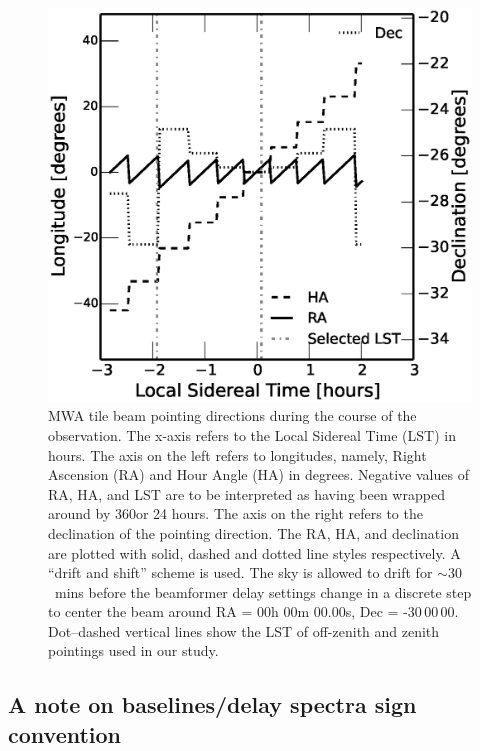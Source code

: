 \documentclass[preprint2,iop,numberedappendix]{emulateapj}
\begin{document}
\begin{figure}[htb]
\centering
\includegraphics[width=\linewidth]{figures/v1_0/custom_pointings.eps}
\caption{MWA tile beam pointing directions during the course of the observation. The x-axis refers to the Local Sidereal Time (LST) in hours. The axis on the left refers to longitudes, namely, Right Ascension (RA) and Hour Angle (HA) in degrees. Negative values of RA, HA, and LST are to be interpreted as having been wrapped around by 360\arcdeg or 24 hours. The axis on the right refers to the declination of the pointing direction. The RA, HA, and declination are plotted with solid, dashed and dotted line styles respectively. A ``drift and shift'' scheme is used. The sky is allowed to drift for $\sim 30$~mins before the beamformer delay settings change in a discrete step to center the beam around RA = 00h 00m 00.00s, Dec = -30\arcdeg$\,$00\arcmin$\,$00. Dot--dashed vertical lines show the LST of off-zenith and zenith pointings used in our study. \label{fig:pointings}}
\end{figure}

\subsection*{A note on baselines/delay spectra sign convention}
\end{document}
